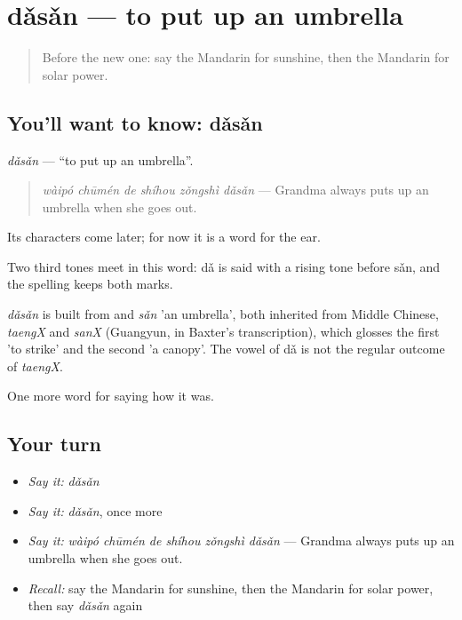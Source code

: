 \section[dǎsǎn]{dǎsǎn — to put up an umbrella}

\label{lesson:ZH-C518-dasan}



\begin{quote}
Before the new one: say the Mandarin for sunshine, then the Mandarin for solar power.
\end{quote}

\subsection*{You'll want to know: dǎsǎn}
\emph{dǎsǎn} — \textquotedblleft{}to put up an umbrella\textquotedblright{}.

\begin{quote}
\emph{wàipó chūmén de shíhou zǒngshì dǎsǎn} — Grandma always puts up an umbrella when she goes out.
\end{quote}

Its characters come later; for now it is a word for the ear.

Two third tones meet in this word: dǎ is said with a rising tone before sǎn, and the spelling keeps both marks.

\begin{cousinweb}
\emph{dǎsǎn} is built from  and \emph{sǎn} 'an umbrella', both inherited from Middle Chinese, \emph{taengX} and \emph{sanX} (Guangyun, in Baxter's transcription), which glosses the first 'to strike' and the second 'a canopy'. The vowel of dǎ is not the regular outcome of \emph{taengX}.
\end{cousinweb}

\begin{grammarlens}[title={What you've built}]
One more word for saying how it was.
\end{grammarlens}

\subsection*{Your turn}
\begin{itemize}
\raggedright
  \item \emph{Say it:} \emph{dǎsǎn}
  \item \emph{Say it:} \emph{dǎsǎn}, once more
  \item \emph{Say it:} \emph{wàipó chūmén de shíhou zǒngshì dǎsǎn} — Grandma always puts up an umbrella when she goes out.
  \item \emph{Recall:} say the Mandarin for sunshine, then the Mandarin for solar power, then say \emph{dǎsǎn} again
\end{itemize}

